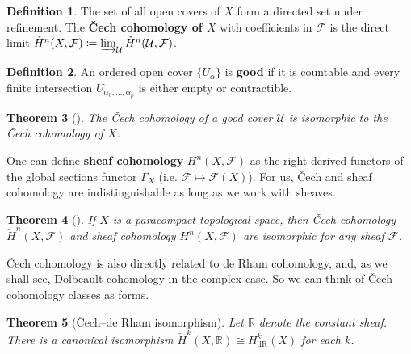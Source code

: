 \documentclass{report}
\theoremstyle{plain}
\newtheorem{theorem}{Theorem}[section]
\theoremstyle{definition}
\newtheorem{definition}[theorem]{Definition}
\theoremstyle{remark}
\newcommand{\bR}{\mathbb{R}}
\newcommand{\cF}{\mathcal{F}}
\newcommand{\cU}{\mathcal{U}}
\newcommand{\chH}{\check{H}}
\newcommand{\dR}{\mathrm{dR}}
\begin{document}
\begin{definition}
  The set of all open covers of $X$ form a directed set under
  refinement. The {\bf \v Cech cohomology of $X$} with coefficients in
  $\cF$ is the direct limit $\chH^n(X, \cF) \coloneqq \varinjlim_{\cU}
  \chH^n(\cU, \cF)$.
\end{definition}

\begin{definition}
  An ordered open cover $\{U_\alpha\}$ is {\bf good} if it is
  countable and every finite intersection $U_{\alpha_0, \ldots,
    \alpha_p}$ is either empty or contractible.
\end{definition}

\begin{theorem}[{\cite[Corollary of Theorem 5.4.1]{Godement1997}}]
  The \v Cech cohomology of a good cover $\cU$ is isomorphic to the \v
  Cech cohomology of $X$.
\end{theorem}

One can define {\bf sheaf cohomology} $H^n(X, \cF)$ as the right
derived functors of the global sections functor $\Gamma_X$ (i.e. $\cF
\mapsto \cF(X)$). For us, \v Cech and sheaf cohomology are
indistinguishable as long as we work with sheaves.

\begin{theorem}[{\cite[Theorem 5.10.1]{Godement1997}}]
  If $X$ is a paracompact topological space, then \v Cech cohomology
  $\chH^n(X, \cF)$ and sheaf cohomology $H^n(X, \cF)$ are isomorphic
  for any sheaf $\cF$.
\end{theorem}

\v Cech cohomology is also directly related to de Rham cohomology,
and, as we shall see, Dolbeault cohomology in the complex case. So we
can think of \v Cech cohomology classes as forms.

\begin{theorem}[\v Cech--de Rham isomorphism]
  Let $\bR$ denote the constant sheaf. There is a canonical
  isomorphism $\chH^k(X, \bR) \cong H_{\dR}^k(X)$ for each $k$.
\end{theorem}
\end{document}
